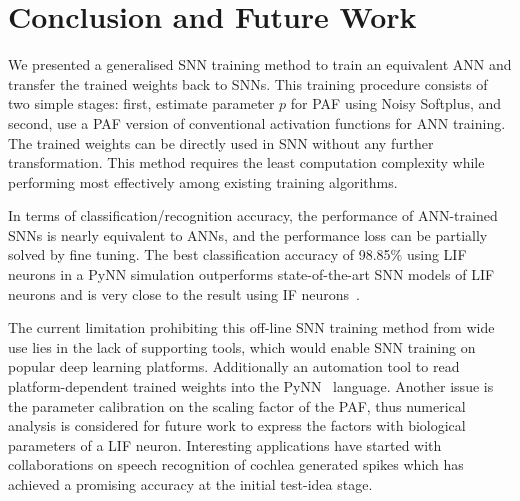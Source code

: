 \documentclass{article}
\begin{document}
	\section{Conclusion and Future Work}
	We presented a generalised SNN training method to train an equivalent ANN and transfer the trained weights back to SNNs.
	This training procedure consists of two simple stages: first, estimate parameter $p$ for PAF using Noisy Softplus, and second, use a PAF version of conventional activation functions for ANN training. %
	The trained weights can be directly used in SNN without any further transformation.
	This method requires the least computation complexity while performing most effectively among existing training algorithms.
	
	In terms of classification/recognition accuracy, the performance of ANN-trained SNNs is nearly equivalent to ANNs, and the performance loss can be partially solved by fine tuning.
	The best classification accuracy of 98.85\% using LIF neurons in a PyNN simulation outperforms state-of-the-art SNN models of LIF neurons and is very close to the result using IF neurons~\cite{diehl2015fast}.
	
	The current limitation prohibiting this off-line SNN training method from wide use lies in the lack of supporting tools, which would enable SNN training on popular deep learning platforms. Additionally an automation tool to read platform-dependent trained weights into the PyNN~\cite{davison2008pynn} language.
	Another issue is the parameter calibration on the scaling factor of the PAF, thus numerical analysis is considered for future work to express the factors with biological parameters of a LIF neuron.
	Interesting applications have started with collaborations on speech recognition of cochlea generated spikes which has achieved a promising accuracy at the initial test-idea stage.
	
\end{document}
